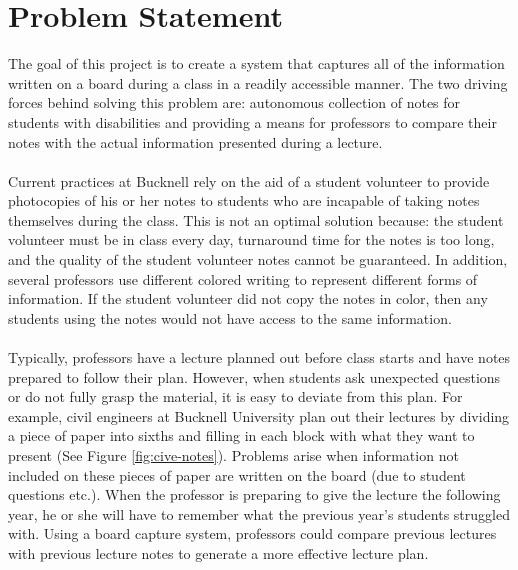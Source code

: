 \documentclass{article}
\begin{document}
	\section*{Problem Statement}
		The goal of this project is to create a system that captures all of the information written on a board during a class in a readily accessible manner. The two driving forces behind solving this problem are: autonomous collection of notes for students with disabilities and providing a means for professors to compare their notes with the actual information presented during a lecture.\\
		\\
		Current practices at Bucknell rely on the aid of a student volunteer to provide photocopies of his or her notes to students who are incapable of taking notes themselves during the class. This is not an optimal solution because: the student volunteer must be in class every day, turnaround time for the notes is too long, and the quality of the student volunteer notes cannot be guaranteed. In addition, several professors use different colored writing to represent different forms of information. If the student volunteer did not copy the notes in color, then any students using the notes would not have access to the same information.\\
		\\
		Typically, professors have a lecture planned out before class starts and have notes prepared to follow their plan. However, when students ask unexpected questions or do not fully grasp the material, it is easy to deviate from this plan. For example, civil engineers at Bucknell University plan out their lectures by dividing a piece of paper into sixths and filling in each block with what they want to present (See Figure \ref{fig:cive-notes}). Problems arise when information not included on these pieces of paper are written on the board (due to student questions etc.). When the professor is preparing to give the lecture the following year, he or she will have to remember what the previous year's students struggled with. Using a board capture system, professors could compare previous lectures with previous lecture notes to generate a more effective lecture plan. 
		
\end{document}
